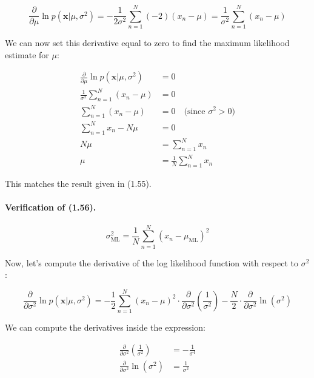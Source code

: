 \documentclass{article}
\begin{document}
\begin{tcolorbox}[breakable,colback=gray!5,colframe=gray!60,title=Solution]
\begin{equation}
  \frac{\partial}{\partial \mu} \ln p(\mathbf{x}|\mu,\sigma^2) = -\frac{1}{2\sigma^2} \sum_{n=1}^N (-2)(x_n - \mu) = \frac{1}{\sigma^2} \sum_{n=1}^N (x_n - \mu)
\end{equation}

We can now set this derivative equal to zero to find the maximum likelihood estimate for \(\mu\):

\begin{align*}
  \frac{\partial}{\partial \mu} \ln p(\mathbf{x}|\mu,\sigma^2) &= 0 \\
  \frac{1}{\sigma^2} \sum_{n=1}^N (x_n - \mu) &= 0 \\
  \sum_{n=1}^N (x_n - \mu) &= 0 \quad \text{(since } \sigma^2 > 0) \\
  \sum_{n=1}^N x_n - N\mu &= 0 \\
  N\mu &= \sum_{n=1}^N x_n \\
  \mu &= \frac{1}{N} \sum_{n=1}^N x_n
\end{align*}

This matches the result given in (1.55).

\paragraph{Verification of (1.56).}
\begin{equation}
  \sigma^2_{\text{ML}} = \frac{1}{N} \sum_{n=1}^N (x_n - \mu_{\text{ML}})^2 \tag{1.56}
\end{equation}

Now, let's compute the derivative of the log likelihood function with respect to \(\sigma^2\):

\begin{equation}
  \frac{\partial}{\partial \sigma^2} \ln p(\mathbf{x}|\mu,\sigma^2) = -\frac{1}{2} \sum_{n=1}^N (x_n - \mu)^2 \cdot \frac{\partial}{\partial \sigma^2} \left( \frac{1}{\sigma^2} \right) - \frac{N}{2} \cdot \frac{\partial}{\partial \sigma^2} \ln(\sigma^2)
\end{equation}

We can compute the derivatives inside the expression:

\begin{align*}
  \frac{\partial}{\partial \sigma^2} \left( \frac{1}{\sigma^2} \right) &= -\frac{1}{\sigma^4} \\
  \frac{\partial}{\partial \sigma^2} \ln(\sigma^2) &= \frac{1}{\sigma^2}
\end{align*}


\end{tcolorbox}
\end{document}
